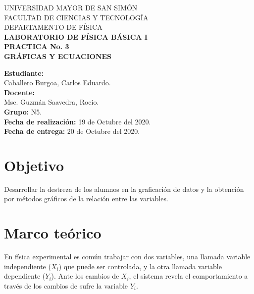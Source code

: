 \documentclass[letter,11pt]{article}
\newcommand{\blankpage}{
\newpage
\thispagestyle{empty}
\mbox{}
\newpage
}
\begin{document}
\begin{titlepage}
\begin{center}
{\Large UNIVERSIDAD MAYOR DE SAN SIMÓN}\\
\vspace*{0.15cm}
{\large FACULTAD DE CIENCIAS Y TECNOLOGÍA}\\
\vspace*{0.10cm}
DEPARTAMENTO DE FÍSICA\\
\vspace*{3.0cm}
{\Large \textbf{LABORATORIO DE FÍSICA BÁSICA I}}\\
\vspace*{0.3cm}
{\Large \textbf{PRACTICA No. 3}}\\
\vspace*{3.5cm}
{\Large \textbf{GRÁFICAS Y ECUACIONES}}\\
\end{center}

\vspace*{7.4cm}
\leftskip=7.95cm
\noindent
\textbf{Estudiante:}\\
Caballero Burgoa, Carlos Eduardo.\\
\newline
\textbf{Docente:}\\
Msc. Guzmán Saavedra, Rocio.\\
\newline
\textbf{Grupo:} N5.\\
\textbf{Fecha de realización:} 19 de Octubre del 2020.\\
\textbf{Fecha de entrega:} 20 de Octubre del 2020.\\

\end{titlepage}

\blankpage

\section{Objetivo}
Desarrollar la destreza de los alumnos en la graficación de datos y la obtención
por métodos gráficos de la relación entre las variables.

\section{Marco teórico}
En física experimental es común trabajar con dos variables, una llamada variable
independiente ($X_i$) que puede ser controlada, y la otra llamada variable
dependiente ($Y_i$). Ante los cambios de $X_i$, el sistema revela el
comportamiento a través de los cambios de sufre la variable $Y_i$.
\end{document}
